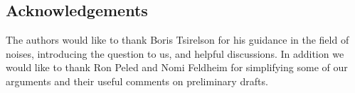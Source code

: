 {
\subsection{Acknowledgements}

The authors would like to thank Boris Tsirelson for his guidance in
the field of noises, introducing the question to us, and helpful
discussions.  In addition we would like to thank Ron Peled and Nomi
Feldheim for simplifying some of our arguments and their useful
comments on preliminary drafts.
}
